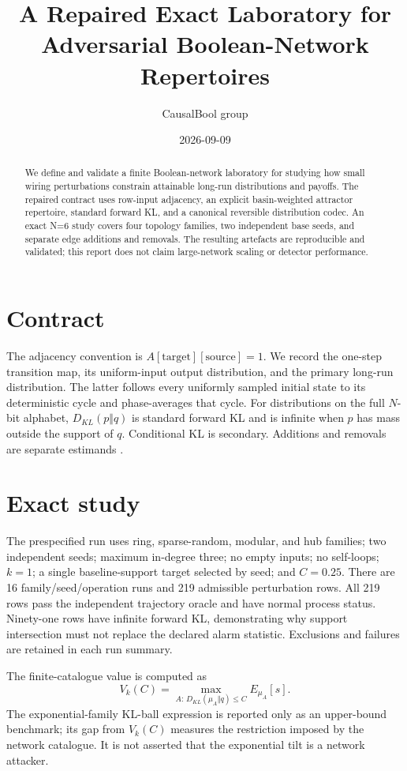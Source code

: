 \documentclass[11pt]{article}
\title{A Repaired Exact Laboratory for Adversarial Boolean-Network Repertoires}
\author{CausalBool group}
\date{2026-09-09}
\begin{document}
\maketitle

\begin{abstract}
We define and validate a finite Boolean-network laboratory for studying how
small wiring perturbations constrain attainable long-run distributions and
payoffs. The repaired contract uses row-input adjacency, an explicit
basin-weighted attractor repertoire, standard forward KL, and a canonical
reversible distribution codec. An exact N=6 study covers four topology
families, two independent base seeds, and separate edge additions and
removals. The resulting artefacts are reproducible and validated; this report
does not claim large-network scaling or detector performance.
\end{abstract}

\section{Contract}
The adjacency convention is $A[\mathrm{target}][\mathrm{source}]=1$. We record
the one-step transition map, its uniform-input output distribution, and the
primary long-run distribution. The latter follows every uniformly sampled
initial state to its deterministic cycle and phase-averages that cycle. For
distributions on the full $N$-bit alphabet, $D_{KL}(p\Vert q)$ is standard
forward KL and is infinite when $p$ has mass outside the support of $q$.
Conditional KL is secondary. Additions and removals are separate estimands .

\section{Exact study}
The prespecified run uses ring, sparse-random, modular, and hub families; two
independent seeds; maximum in-degree three; no empty inputs; no self-loops;
$k=1$; a single baseline-support target selected by seed; and $C=0.25$.
There are 16 family/seed/operation runs and 219 admissible perturbation rows.
All 219 rows pass the independent trajectory oracle and have normal process
status. Ninety-one rows have infinite forward KL, demonstrating why support
intersection must not replace the declared alarm statistic. Exclusions and
failures are retained in each run summary.

The finite-catalogue value is computed as
\[
 V_k(C)=\max_{A:\,D_{KL}(\mu_A\Vert q)\le C} E_{\mu_A}[s].
\]
The exponential-family KL-ball expression is reported only as an upper-bound
benchmark; its gap from $V_k(C)$ measures the restriction imposed by the
network catalogue. It is not asserted that the exponential tilt is a network
attacker.
\end{document}
